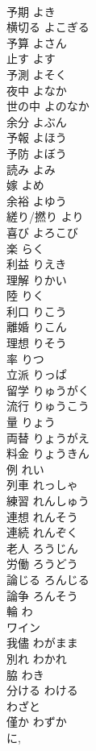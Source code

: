 \documentclass[8pt]{extreport}
\begin{document}
\begin{CJK}{UTF8}{min}
\\	予期	よき	
\\	横切る	よこぎる	
\\	予算	よさん	
\\	止す	よす	
\\	予測	よそく	
\\	夜中	よなか	
\\	世の中	よのなか	
\\	余分	よぶん	
\\	予報	よほう	
\\	予防	よぼう	
\\	読み	よみ	
\\	嫁	よめ	
\\	余裕	よゆう	
\\	縒り/撚り	より	
\\	喜び	よろこび	
\\	楽	らく	
\\	利益	りえき	
\\	理解	りかい	
\\	陸	りく	
\\	利口	りこう	
\\	離婚	りこん	
\\	理想	りそう	
\\	率	りつ	
\\	立派	りっぱ	
\\	留学	りゅうがく	
\\	流行	りゅうこう	
\\	量	りょう	
\\	両替	りょうがえ	
\\	料金	りょうきん	
\\	例	れい	
\\	列車	れっしゃ	
\\	練習	れんしゅう	
\\	連想	れんそう	
\\	連続	れんぞく	
\\	老人	ろうじん	
\\	労働	ろうどう	
\\	論じる	ろんじる	
\\	論争	ろんそう	
\\	輪	わ	
\\	ワイン		
\\	我儘	わがまま	
\\	別れ	わかれ	
\\	脇	わき	
\\	分ける	わける	
\\	わざと		
\\	僅か	わずか	
\\	に, 

\end{CJK}
\end{document}
